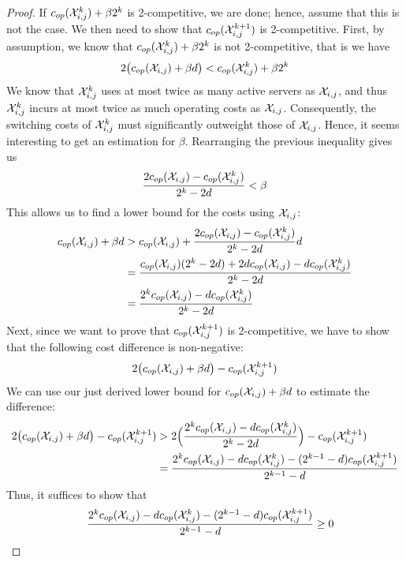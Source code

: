 \begin{proof}
If $c_{op}(\mathcal{X}_{i,j}^k)+\beta 2^k$ is 2-competitive, we are done; hence, assume that this is not the case. We then need to show that $c_{op}(\mathcal{X}_{i,j}^{k+1})$ is 2-competitive. First, by assumption, we know that $c_{op}(\mathcal{X}_{i,j}^k)+\beta 2^k$ is not 2-competitive, that is we have
\begin{equation*}
	2\bigl(c_{op}(\mathcal{X}_{i,j})+\beta d\bigr)<c_{op}(\mathcal{X}_{i,j}^k)+\beta 2^k
\end{equation*}
We know that $\mathcal{X}_{i,j}^k$ uses at most twice as many active servers as $\mathcal{X}_{i,j}$, and thus $\mathcal{X}_{i,j}^k$ incurs at most twice as much operating costs as $\mathcal{X}_{i,j}$. Consequently, the switching costs of $\mathcal{X}_{i,j}^k$ must significantly outweight those of $\mathcal{X}_{i,j}$. Hence, it seems interesting to get an estimation for $\beta$. Rearranging the previous inequality gives us
\begin{equation*}
	\frac{2c_{op}(\mathcal{X}_{i,j})-c_{op}(\mathcal{X}_{i,j}^k)}{2^k-2d}<\beta
\end{equation*}
This allows us to find a lower bound for the costs using $\mathcal{X}_{i,j}$:
\begin{align*}
	c_{op}(\mathcal{X}_{i,j})+\beta d&>c_{op}(\mathcal{X}_{i,j})+\frac{2c_{op}(\mathcal{X}_{i,j})-c_{op}(\mathcal{X}_{i,j}^k)}{2^k-2d}d\\
	&=\frac{c_{op}(\mathcal{X}_{i,j})(2^k-2d)+2dc_{op}(\mathcal{X}_{i,j})-dc_{op}(\mathcal{X}_{i,j}^k)}{2^k-2d}\\
	&=\frac{2^kc_{op}(\mathcal{X}_{i,j})-dc_{op}(\mathcal{X}_{i,j}^k)}{2^k-2d}
\end{align*}
Next, since we want to prove that $c_{op}(\mathcal{X}_{i,j}^{k+1})$ is 2-competitive, we have to show that the following cost difference is non-negative:
\begin{align*}
	2\bigl(c_{op}(\mathcal{X}_{i,j})+\beta d\bigr)-c_{op}(\mathcal{X}_{i,j}^{k+1})
\end{align*}
We can use our just derived lower bound for $c_{op}(\mathcal{X}_{i,j})+\beta d$ to estimate the difference:
\begin{align*}
	2\bigl(c_{op}(\mathcal{X}_{i,j})+\beta d\bigr)-c_{op}(\mathcal{X}_{i,j}^{k+1})&>2\Bigl(\frac{2^kc_{op}(\mathcal{X}_{i,j})-dc_{op}(\mathcal{X}_{i,j}^k)}{2^k-2d}\Bigr)-c_{op}(\mathcal{X}_{i,j}^{k+1})\\
	&=\frac{2^kc_{op}(\mathcal{X}_{i,j})-dc_{op}(\mathcal{X}_{i,j}^k)-(2^{k-1}-d)c_{op}(\mathcal{X}_{i,j}^{k+1})}{2^{k-1}-d}
\end{align*}
Thus, it suffices to show that
\begin{align*}
	&&\frac{2^k\opcosts(\mx_{i,j})-d\opcosts(\mx_{i,j}^k)-(2^{k-1}-d)\opcosts(\mx_{i,j}^{k+1})}{2^{k-1}-d}&\ge 0\\

\end{align*}
\end{proof}
